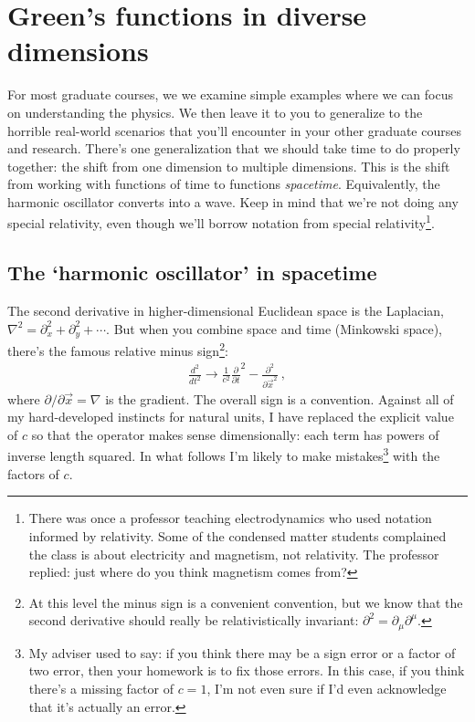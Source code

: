 
\section{Green's functions in diverse dimensions}

For most graduate courses, we we examine simple examples where we can focus on understanding the physics. We then leave it to you to generalize to the horrible real-world scenarios that you'll encounter in your other graduate courses and research. There's one generalization that we should take time to do properly together: the shift from one dimension to multiple dimensions. This is the shift from working with functions of time to functions \emph{spacetime}. Equivalently, the harmonic oscillator converts into a wave.
%
Keep in mind that we're not doing any special relativity, even though we'll borrow notation from special relativity\footnote{There was once a professor teaching electrodynamics who used notation informed by relativity. Some of the condensed matter students complained the class is about electricity and magnetism, not relativity. The professor replied: just where do you think magnetism comes from?}. 

\subsection{The `harmonic oscillator' in spacetime}
The second derivative in higher-dimensional Euclidean space is the Laplacian, $\nabla^2= \partial_x^2 + \partial_y^2 +\cdots$. But when you combine space and time (Minkowski space), there's the famous relative minus sign\footnote{At this level the minus sign is a convenient convention, but we know that the second derivative should really be relativistically invariant: $\partial^2 = \partial_\mu \partial^\mu$.}:
\begin{align}
	\frac{d^2}{dt^2}
	\to 
	\frac{1}{c^2}
	\frac{\partial}{\partial t}^2
	-
	\frac{\partial^2}
	{\partial \vec x^2} \ ,
\end{align}
where $\partial/\partial\vec x = \nabla$ is the gradient. The overall sign is a convention. Against all of my hard-developed instincts for natural units, I have replaced the explicit value of $c$ so that the operator makes sense dimensionally: each term has powers of inverse length squared. In what follows I'm likely to make mistakes\footnote{My adviser used to say: if you think there may be a sign error or a factor of two error, then your homework is to fix those errors. In this case, if you think there's a missing factor of $c=1$, I'm not even sure if I'd even acknowledge that it's actually an error.} with the factors of $c$. 



